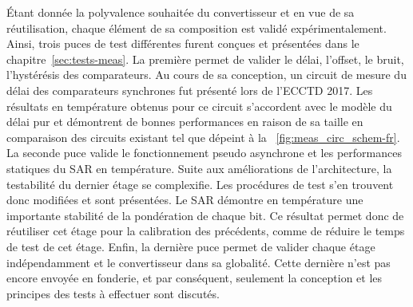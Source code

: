 \begin{mdframed}[linecolor=Prune,linewidth=1]
    Étant donnée la polyvalence souhaitée du convertisseur et en vue de sa réutilisation, chaque élément de sa composition est validé expérimentalement. Ainsi, trois puces de test différentes furent conçues et présentées dans le chapitre~\ref{sec:tests-meas}. La première permet de valider le délai, l'offset, le bruit, l’hystérésis des comparateurs. Au cours de sa conception, un circuit de mesure du délai des comparateurs synchrones fut présenté lors de l'ECCTD 2017. Les résultats en température obtenus pour ce circuit s'accordent avec le modèle du délai pur et démontrent de bonnes performances en raison de sa taille en comparaison des circuits existant tel que dépeint à la \figurename~\ref{fig:meas_circ_schem-fr}. La seconde puce valide le fonctionnement pseudo asynchrone et les performances statiques du SAR en température. Suite aux améliorations de l'architecture, la testabilité du dernier étage se complexifie. Les procédures de test s'en trouvent donc modifiées et sont présentées. Le SAR démontre en température une importante stabilité de la pondération de chaque bit. Ce résultat permet donc de réutiliser cet étage pour la calibration des précédents, comme de réduire le temps de test de cet étage. Enfin, la dernière puce permet de valider chaque étage indépendamment et le convertisseur dans sa globalité. Cette dernière n'est pas encore envoyée en fonderie, et par conséquent, seulement la conception et les principes des tests à effectuer sont discutés.
    

\end{mdframed}
